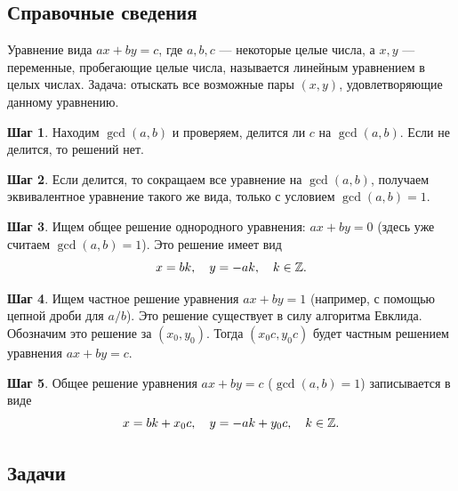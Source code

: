
\subsection*{Справочные сведения}

Уравнение вида $ax+by=c$, где $a,b,c$ --- некоторые целые числа, а $x,y$ --- переменные, пробегающие целые числа, называется линейным уравнением в целых числах. Задача: отыскать все возможные пары $(x,y)$, удовлетворяющие данному уравнению.

\textbf{Шаг 1}. Находим $\gcd(a,b)$ и проверяем, делится ли $c$ на $\gcd(a,b)$. Если не делится, то решений нет.

\textbf{Шаг 2}. Если делится, то сокращаем все уравнение на $\gcd(a,b)$, получаем эквивалентное уравнение такого же вида, только с условием $\gcd(a,b)=1$.

\textbf{Шаг 3}. Ищем общее решение однородного уравнения: $ax+by=0$ (здесь уже считаем $\gcd(a,b)=1$). Это решение имеет вид
$$
x=bk,\quad y=-ak, \quad k\in\mathbb Z.
$$

\textbf{Шаг 4}. Ищем частное решение уравнения $ax+by=1$ (например, с помощью цепной дроби для $a/b$). Это решение существует в силу алгоритма Евклида. Обозначим это решение за $(x_0,y_0)$. Тогда $(x_0c,y_0c)$ будет частным решением уравнения $ax+by=c$.

\textbf{Шаг 5}. Общее решение уравнения $ax+by=c$ ($\gcd(a,b)=1$) записывается в виде 
$$
x=bk+x_0c,\quad y=-ak+y_0c, \quad k\in\mathbb Z.
$$


\subsection*{Задачи}

